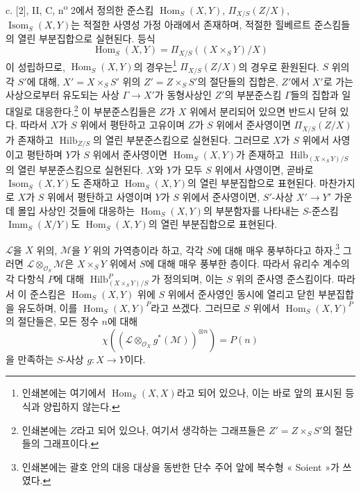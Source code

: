\medskip
\noindent c. [2], II, C, n\textsuperscript{o} 2에서 정의한 준스킴
$\operatorname{Hom}_S(X,Y)$, $\Pi_{X/S}(Z/X)$,
$\operatorname{Isom}_S(X,Y)$는 적절한 사영성 가정 아래에서 존재하며,
적절한 힐베르트 준스킴들의 열린 부분집합으로 실현된다. 등식
\[
\operatorname{Hom}_S(X,Y)=\Pi_{X/S}((X\times_SY)/X)
\]
이 성립하므로, $\operatorname{Hom}_S(X,Y)$의
경우는\footnote{인쇄본에는 여기에서
$\operatorname{Hom}_S(X,X)$라고 되어 있으나, 이는 바로 앞의 표시된
등식과 양립하지 않는다.} $\Pi_{X/S}(Z/X)$의 경우로 환원된다.
$S$ 위의 각 $S'$에 대해, $X'=X\times_SS'$ 위의
$Z'=Z\times_SS'$의 절단들의 집합은, $Z'$에서 $X'$로 가는 사상으로부터
유도되는 사상 $\Gamma\longrightarrow X'$가 동형사상인 $Z'$의
부분준스킴 $\Gamma$들의 집합과 일대일로 대응한다.\footnote{
인쇄본에는 $Z$라고 되어 있으나, 여기서 생각하는
그래프들은 $Z'=Z\times_SS'$의 절단들의 그래프이다.} 이 부분준스킴들은
$Z$가 $X$ 위에서 분리되어 있으면 반드시 닫혀 있다. 따라서
$X$가 $S$ 위에서 평탄하고 고유이며 $Z$가 $S$ 위에서 준사영이면
$\Pi_{X/S}(Z/X)$가 존재하고 $\operatorname{Hilb}_{Z/S}$의 열린
부분준스킴으로 실현된다. 그러므로 $X$가 $S$ 위에서 사영이고 평탄하며
$Y$가 $S$ 위에서 준사영이면 $\operatorname{Hom}_S(X,Y)$가 존재하고
$\operatorname{Hilb}_{(X\times_SY)/S}$의 열린 부분준스킴으로 실현된다.
$X$와 $Y$가 모두 $S$ 위에서 사영이면, 곧바로
$\operatorname{Isom}_S(X,Y)$도 존재하고
$\operatorname{Hom}_S(X,Y)$의 열린 부분집합으로 표현된다. 마찬가지로
$X$가 $S$ 위에서 평탄하고 사영이며 $Y$가 $S$ 위에서 준사영이면,
$S'$-사상 $X'\longrightarrow Y'$ 가운데 몰입 사상인 것들에 대응하는
$\operatorname{Hom}_S(X,Y)$의 부분함자를 나타내는 $S$-준스킴
$\operatorname{Imm}_S(X/Y)$도 $\operatorname{Hom}_S(X,Y)$의 열린
부분집합으로 표현된다.

$\mathcal L$을 $X$ 위의, $\mathcal M$을 $Y$ 위의 가역층이라 하고,
각각 $S$에 대해 매우 풍부하다고 하자.\footnote{인쇄본에는 괄호 안의 대응 대상을 동반한 단수 주어 앞에 복수형
« Soient »가 쓰였다.} 그러면
$\mathcal L\otimes_{\mathcal O_S}\mathcal M$은 $X\times_SY$ 위에서
$S$에 대해 매우 풍부한 층이다. 따라서 유리수 계수의 각 다항식 $P$에
대해 $\operatorname{Hilb}^P_{(X\times_SY)/S}$가 정의되며, 이는 $S$
위의 준사영 준스킴이다. 따라서 이 준스킴은
$\operatorname{Hom}_S(X,Y)$ 위에 $S$ 위에서 준사영인 동시에 열리고
닫힌 부분집합을 유도하며, 이를 $\operatorname{Hom}_S(X,Y)^P$라고
쓰겠다. 그러므로 $S$ 위에서 $\operatorname{Hom}_S(X,Y)^P$의 절단들은,
모든 정수 $n$에 대해
\[
\chi\!\left(\left(\mathcal L\otimes_{\mathcal O_X}g^*(\mathcal M)\right)^{
\otimes n}\right)=P(n)
\]
을 만족하는 $S$-사상 $g:X\longrightarrow Y$이다.

